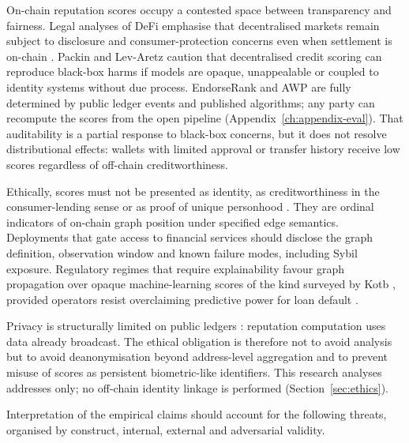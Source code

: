
On-chain reputation scores occupy a contested space between transparency and fairness. Legal analyses of DeFi emphasise that decentralised markets remain subject to disclosure and consumer-protection concerns even when settlement is on-chain . Packin and Lev-Aretz caution that decentralised credit scoring can reproduce black-box harms if models are opaque, unappealable or coupled to identity systems without due process. EndorseRank and AWP are fully determined by public ledger events and published algorithms; any party can recompute the scores from the open pipeline (Appendix~\ref{ch:appendix-eval}). That auditability is a partial response to black-box concerns, but it does not resolve distributional effects: wallets with limited approval or transfer history receive low scores regardless of off-chain creditworthiness.

Ethically, scores must not be presented as identity, as creditworthiness in the consumer-lending sense or as proof of unique personhood . They are ordinal indicators of on-chain graph position under specified edge semantics. Deployments that gate access to financial services should disclose the graph definition, observation window and known failure modes, including Sybil exposure. Regulatory regimes that require explainability favour graph propagation over opaque machine-learning scores of the kind surveyed by Kotb , provided operators resist overclaiming predictive power for loan default .

Privacy is structurally limited on public ledgers : reputation computation uses data already broadcast. The ethical obligation is therefore not to avoid analysis but to avoid deanonymisation beyond address-level aggregation and to prevent misuse of scores as persistent biometric-like identifiers. This research analyses addresses only; no off-chain identity linkage is performed (Section~\ref{sec:ethics}).


Interpretation of the empirical claims should account for the following threats, organised by construct, internal, external and adversarial validity.


